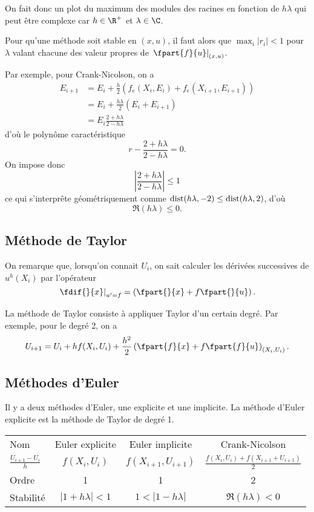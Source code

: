 On fait donc un plot du maximum des modules des racines en fonction de $h\lambda$ qui peut
être complexe car $h \in \R^+$ et $\lambda \in \C$.

Pour qu'une méthode soit stable en $(x, u)$,
il faut alors que $\max_i |r_i| < 1$ pour
$\lambda$ valant chacune des valeur
propres de $\left.\fpart{f}{u}\right|_{(x,u)}$.

\begin{myexem}
  Par exemple, pour Crank-Nicolson, on a
  \begin{align*}
    E_{i+1} & = E_i + \frac{h}{2} (f_e(X_i, E_i) + f_e(X_{i+1}, E_{i+1}))\\
            & = E_i + \frac{h\lambda}{2} (E_i + E_{i+1})\\
            & = E_i \frac{2 + h\lambda}{2 - h\lambda}
  \end{align*}
  d'où le polynôme caractéristique
  \[ r - \frac{2 + h\lambda}{2 - h\lambda} = 0. \]
  On impose donc
  \[ \left|\frac{2 + h\lambda}{2 - h\lambda}\right| \leq 1 \]
  ce qui s'interprête géométriquement comme
  $\operatorname{dist}(h\lambda, -2) \leq \operatorname{dist}(h\lambda, 2)$, d'où
  \[ \Re(h\lambda) \leq 0. \]
\end{myexem}

\subsection{Méthode de Taylor}
On remarque que, lorsqu'on connait $U_i$, on sait calculer les dérivées
successives de $u^h(X_i)$ par l'opérateur
\[ \left.\fdif{}{x}\right|_{u'=f} = \left(\fpart{}{x} + f\fpart{}{u}\right). \]

La méthode de Taylor consiste à appliquer Taylor d'un certain degré.
Par exemple, pour le degré 2, on a
\[ U_{i+1} = U_i + h f(X_i, U_i) +
\frac{h^2}{2}\left(\fpart{f}{x}+f\fpart{f}{u}\right)_{(X_i,U_i)}. \]

\subsection{Méthodes d'Euler}
Il y a deux méthodes d'Euler, une explicite et une implicite.
La méthode d'Euler explicite est la méthode de Taylor de degré 1.
\begin{center}
  \begin{tabular}{|l|ccc|}
    \hline
    Nom & Euler explicite & Euler implicite & Crank-Nicolson\\
    $\frac{U_{i+1}-U_i}{h}$ & $f(X_i,U_i)$ & $f(X_{i+1},U_{i+1})$
    & $\frac{f(X_i,U_i)+f(X_{i+1}+U_{i+1})}{2}$\\
    Ordre & 1 & 1 & 2\\
    Stabilité & $|1 + h\lambda| < 1$ & $1 < |1 - h\lambda|$
    & $\Re(h\lambda) < 0$\\
    \hline
  \end{tabular}
\end{center}

